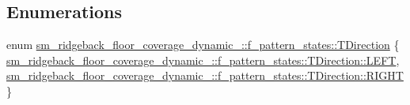 \subsection*{Enumerations}
\begin{DoxyCompactItemize}
\item 
enum \hyperlink{namespacesm__ridgeback__floor__coverage__dynamic__1_1_1f__pattern__states_a60ecc1007032973e1e8336636cd65018}{sm\+\_\+ridgeback\+\_\+floor\+\_\+coverage\+\_\+dynamic\+\_\+::f\+\_\+pattern\+\_\+states\+::\+T\+Direction} \{ \hyperlink{namespacesm__ridgeback__floor__coverage__dynamic__1_1_1f__pattern__states_a60ecc1007032973e1e8336636cd65018a684d325a7303f52e64011467ff5c5758}{sm\+\_\+ridgeback\+\_\+floor\+\_\+coverage\+\_\+dynamic\+\_\+::f\+\_\+pattern\+\_\+states\+::\+T\+Direction\+::\+L\+E\+FT}, 
\hyperlink{namespacesm__ridgeback__floor__coverage__dynamic__1_1_1f__pattern__states_a60ecc1007032973e1e8336636cd65018a21507b40c80068eda19865706fdc2403}{sm\+\_\+ridgeback\+\_\+floor\+\_\+coverage\+\_\+dynamic\+\_\+::f\+\_\+pattern\+\_\+states\+::\+T\+Direction\+::\+R\+I\+G\+HT}
 \}
\end{DoxyCompactItemize}
